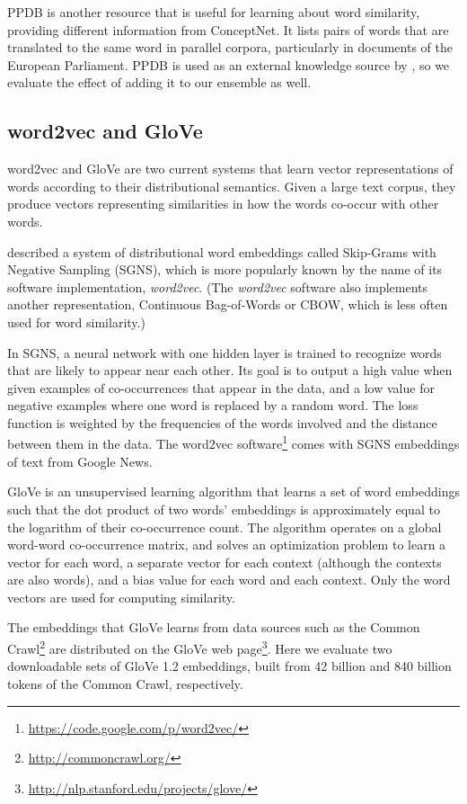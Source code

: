 \documentclass[11pt,letterpaper]{article}
\begin{document}
PPDB \cite{ganitkevitch2013ppdb} is another resource that is useful for
learning about word similarity, providing different information from
ConceptNet. It lists pairs of words that are translated to the same word in parallel
corpora, particularly in documents of the European Parliament. PPDB is used
as an external knowledge source by , so
we evaluate the effect of adding it to our ensemble as well.

\subsection{word2vec and GloVe}

word2vec and GloVe are two current systems that learn vector representations
of words according to their distributional semantics. Given a large text corpus,
they produce vectors representing similarities in how the words co-occur with
other words.

 described a system of distributional word
embeddings called Skip-Grams with Negative Sampling (SGNS), which is more
popularly known by the name of its software implementation, {\em word2vec}.
(The {\em word2vec} software also implements another representation, Continuous
Bag-of-Words or CBOW, which is less often used for word similarity.)

In SGNS, a neural network with one hidden layer is trained to recognize words
that are likely to appear near each other. Its goal is to output a high value
when given examples of co-occurrences that appear in the data, and a low value
for negative examples where one word is replaced by a random word. The loss
function is weighted by the frequencies of the words involved and the distance
between them in the data. The word2vec
software\footnote{\url{https://code.google.com/p/word2vec/}} comes with SGNS
embeddings of text from Google News.

GloVe \cite{pennington2014glove} is an unsupervised learning algorithm that
learns a set of word embeddings such that the dot product of two words'
embeddings is approximately equal to the logarithm of their co-occurrence count.
The algorithm operates on a global word-word co-occurrence matrix, and
solves an optimization problem to learn a vector for each word, a separate
vector for each context (although the contexts are also words), and a bias
value for each word and each context. Only the word vectors are used for
computing similarity.

The embeddings that GloVe learns from data sources such as the Common
Crawl\footnote{\url{http://commoncrawl.org/}} are distributed on the GloVe web
page\footnote{\url{http://nlp.stanford.edu/projects/glove/}}. Here we evaluate
two downloadable sets of GloVe 1.2 embeddings, built from 42 billion and 840
billion tokens of the Common Crawl, respectively.
\end{document}
